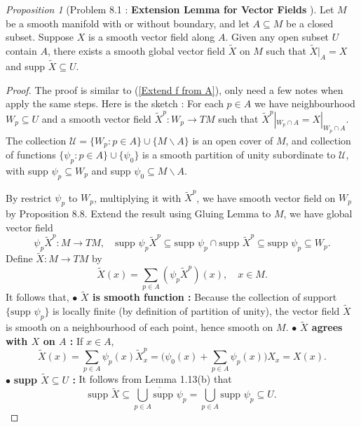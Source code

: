 \documentclass[a4paper]{article}
\theoremstyle{remark}
\newtheorem{prop}{Proposition}
\newcommand{\subhim}{\subseteq} %
\begin{document}
\begin{prop}[Problem 8.1 : \textbf{Extension Lemma for Vector Fields} \cite{LeeSM}]
Let $M$ be a smooth manifold with or without boundary, and let $A \subhim M$ be a closed subset. Suppose $X$ is a smooth vector field along $A$. Given any open subset $U$ contain $A$, there exists a smooth global vector field $\widetilde{X}$ on $M$ such that $\widetilde{X}|_A = X$ and supp $\widetilde{X} \subhim U$.
\end{prop}
\begin{proof}
The proof is similar to (\ref{Extend f from A}), only need a few notes when apply the same steps. Here is the sketch : For each $p \in A$ we have neighbourhood $W_p \subhim U$ and a smooth vector field $\widetilde{X}^p : W_p \to TM$ such that $\widetilde{X}^p|_{W_p \cap A} = X|_{W_p \cap A}$. The collection $\mathcal{U} = \{ W_p : p \in A \} \cup \{ M \smallsetminus A \} $ is an open cover of $M$, and collection of functions $\{ \psi_p : p \in A \} \cup \{ \psi_0 \}$ is a smooth partition of unity subordinate to $\mathcal{U}$, with supp $\psi_p \subhim W_p$ and supp $\psi_0 \subhim M\smallsetminus A$.

By restrict $\psi_p$ to $W_p$, multiplying it with $\widetilde{X}^p$, we have smooth vector field on $W_p$ by Proposition 8.8. Extend the result using Gluing Lemma to $M$, we have global vector field 
$$
\psi_p \widetilde{X}^p : M \to TM, \quad \text{supp }\psi_p \widetilde{X}^p \subhim \text{supp }\psi_p \cap \text{supp } \widetilde{X}^p \subhim   \text{supp }\psi_p \subhim W_p .
$$
Define $\widetilde{X} : M \to TM$ by
$$
\widetilde{X}(x) = \sum_{p \in A} (\psi_p \widetilde{X}^p)(x), \quad x \in M.
$$
It follows that, \newline
$\bullet $ \textbf{$\widetilde{X}$ is smooth function :} Because the collection of support $\{\text{supp } \psi_p\}$ is locally finite (by definition of partition of unity), the vector field $\widetilde{X}$ is smooth on a neighbourhood of each point, hence smooth on $M$.\newline
$\bullet $ \textbf{$\widetilde{X}$ agrees with $X$ on $A$ :} If $x \in A$,
$$
\widetilde{X}(x) = \sum_{p\in A} \psi_p(x) \widetilde{X}^p_x = \Big(\psi_0(x) + \sum_{p \in A} \psi_p(x) \Big) X_x = X (x).
$$ 
\newline 
$\bullet $ \textbf{supp $\widetilde{X} \subhim U$ : }It follows from Lemma 1.13(b) that 
$$
\text{supp } \widetilde{X} \subhim \overline{\bigcup_{p \in A} \text{supp } \psi_p}  = \bigcup_{p \in A} \text{supp }\psi_p \subhim U. 
$$ 
\end{proof}
\end{document}
